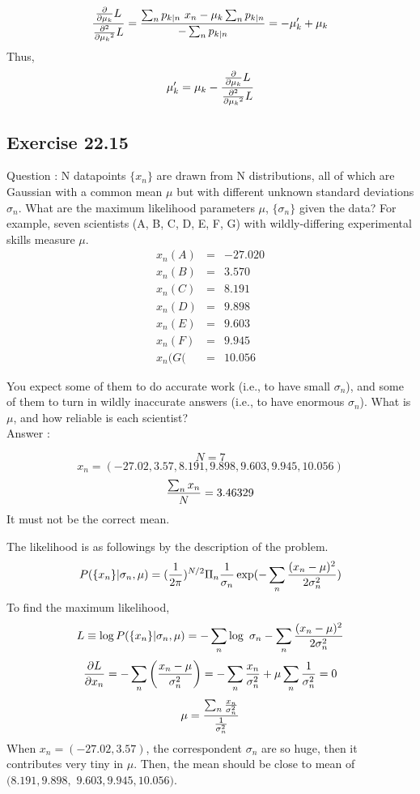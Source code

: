 \documentclass[a4paper,11pt]{article}
\numberwithin{equation}{section}
\begin{document}
{$$
{{\partial \over \partial{\mu_k}}L \over {\partial^2 \over \partial{\mu_k}^2}L  } = {\sum_n p_{k|n} ~x_n -  \mu_k\sum_n p_{k|n} \over -\sum_n p_{k|n}}= -\mu'_k+\mu_k
$$
Thus, 
$$
\mu'_k=\mu_k-{{\partial \over \partial{\mu_k}}L \over {\partial^2 \over \partial{\mu_k}^2}L  }
$$

\subsection{Exercise 22.15}

Question : N datapoints $\{x_n\}$ are drawn from
N distributions, all of which are Gaussian with a common mean $\mu$ but
with different unknown standard deviations $\sigma_n$. What are the maximum
likelihood parameters $\mu$, $\{\sigma_n\}$ given the data? For example, seven scientists (A, B, C, D, E, F, G) with wildly-differing experimental skills
measure $\mu$.
\begin{eqnarray*}
x_n(A) &=& -27.020\\
x_n(B) &=& 3.570\\
x_n(C) &=& 8.191\\
x_n(D) &=& 9.898\\
x_n(E) &=& 9.603\\
x_n(F) &=& 9.945\\
x_n(G( &=& 10.056
\end{eqnarray*}


You expect some of them to do accurate work (i.e., to have
small $\sigma_n$), and some of them to turn in wildly inaccurate answers (i.e.,
to have enormous $\sigma_n$). What is $\mu$, and how reliable is each scientist?
$$
$$
Answer :

$$
N=7
$$
$$
x_n=(-27.02, 3.57, 8.191, 9.898, 9.603, 9.945, 10.056)
$$
$$
{\sum_n x_n\over N}=3.46329
$$
It must not be the correct mean. 

The likelihood is as followings by the description of the problem. 
$$
P(\{x_n\}|\sigma_n,\mu) = ({1 \over 2\pi })^{N/2} \Pi_n{1\over \sigma_n } \exp(-\sum_n {(x_n-\mu)^2 \over 2\sigma^2_n})
$$ 
To find the maximum likelihood,
$$
L \equiv \log P(\{x_n\}|\sigma_n,\mu) = -\sum_n \log~\sigma_n-\sum_n {(x_n -\mu)^2 \over 2\sigma_n^2} 
$$
$$
{\partial L \over \partial x_n} = -\sum_n \left({x_n-\mu \over \sigma^2_n}\right)=-\sum_n{x_n \over \sigma_n^2}+\mu\sum_n {1 \over \sigma_n^2} = 0
$$
$$
\mu= {\sum_n{x_n\over \sigma_n^2}\over{1\over \sigma_n^2}}
$$
When $x_n=(-27.02, 3.57)$, the correspondent $\sigma_n$ are so huge, then it contributes very tiny in $\mu$. Then, the mean should be close to mean of $(8.191, 9.898,$ 
$9.603, 9.945, 10.056)$.


}
\end{document}
